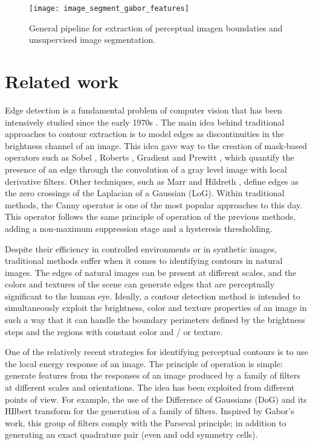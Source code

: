 \begin{figure}[!ht]
	\centering
	\texttt{[image: image\_segment\_gabor\_features]}
	\caption{General pipeline for extraction of perceptual imagen boundaties and unsupervised image segmentation.}\label{fig:pipeline_gabor_image_segmentation}
\end{figure}

\section{Related work}
Edge detection is a fundamental problem of computer vision that has been intensively studied since the early 1970s \citep{Hueckel:JACM:1971, Fram.Deutsch:TC:1975}. The main idea behind traditional approaches to contour extraction is to model edges as discontinuities in the brightness channel of an image. This idea gave way to the creation of mask-based operators such as Sobel \citep{Maitre:Book:2003}, Roberts \citep{Roberts:Thesis:1963}, Gradient \citep{Maitre:Book:2003} and Prewitt \citep{Prewitt:PPP:1970}, which quantify the presence of an edge through the convolution of a gray level image with local derivative filters. Other techniques, such as Marr and Hildreth \citep{Marr.Hildreth:PRS:1980}, define edges as the zero crossings of the Laplacian of a Gaussian (LoG). Within traditional methods, the Canny \citep{Canny:PAMI:1986} operator is one of the most popular approaches to this day. This operator follows the same principle of operation of the previous methods, adding a non-maximum suppression stage and a hysteresis thresholding.

Despite their efficiency in controlled environments or in synthetic images, traditional methods suffer when it comes to identifying contours in natural images. The edges of natural images can be present at different scales, and the colors and textures of the scene can generate edges that are perceptually significant to the human eye. Ideally, a contour detection method is intended to simultaneously exploit the brightness, color and texture properties of an image in such a way that it can handle the boundary perimeters defined by the brightness steps and the regions with constant color and / or texture.

One of the relatively recent strategies for identifying perceptual contours is to use the local energy response of an image. The principle of operation is simple: generate features from the responses of an image produced by a family of filters at different scales and orientations. The idea has been exploited from different points of view. For example, the use of the  Difference of Gaussians (DoG) and its HIlbert transform \citep{Morrone.Owens:PR:1987, Morrone.Burr.ea:RSL:1988} for the generation of a family of filters. Inspired by Gabor's work, this group of filters comply with the Parseval principle; in addition to generating an exact quadrature pair (even and odd symmetry cells).

